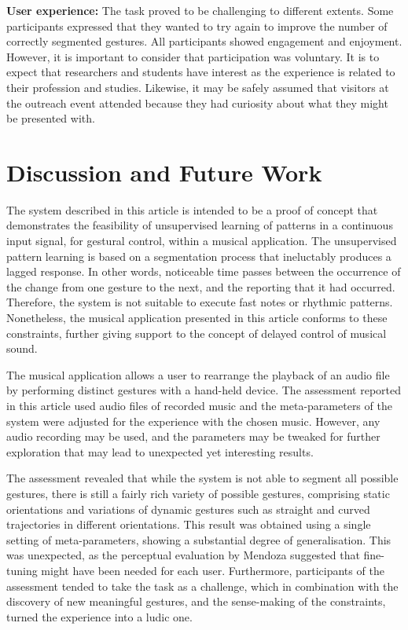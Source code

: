 \documentclass{nime-alternate_MANUSCRIPT} %
\begin{document}
\textbf{User experience:} The task proved to be challenging to different extents. Some participants expressed that they wanted to try again to improve the number of correctly segmented gestures. All participants showed engagement and enjoyment. However, it is important to consider that participation was voluntary. It is to expect that researchers and students have interest as the experience is related to their profession and studies. Likewise, it may be safely assumed that visitors at the outreach event attended because they had curiosity about what they might be presented with.

\section{Discussion and Future Work}

The system described in this article is intended to be a proof of concept that demonstrates the feasibility of unsupervised learning of patterns in a continuous input signal, for gestural control, within a musical application. The unsupervised pattern learning is based on a segmentation process that ineluctably produces a lagged response. In other words, noticeable time passes between the occurrence of the change from one gesture to the next, and the reporting that it had occurred. Therefore, the system is not suitable to execute fast notes or rhythmic patterns. Nonetheless, the musical application presented in this article conforms to these constraints, further giving support to the concept of delayed control of musical sound.

The musical application allows a user to rearrange the playback of an audio file by performing distinct gestures with a hand-held device. The assessment reported in this article used audio files of recorded music and the meta-parameters of the system were adjusted for the experience with the chosen music. However, any audio recording may be used, and the parameters may be tweaked for further exploration that may lead to unexpected yet interesting results.

The assessment revealed that while the system is not able to segment all possible gestures, there is still a fairly rich variety of possible gestures, comprising static orientations and variations of dynamic gestures such as straight and curved trajectories in different orientations. This  result was obtained using a single setting of meta-parameters, showing a substantial degree of generalisation. This was unexpected, as the perceptual evaluation by 
Mendoza \cite{Mendoza_2022}
suggested that fine-tuning might have been needed for each user. Furthermore, participants of the assessment tended to take the task as a challenge, which in combination with the discovery of new meaningful gestures, and the sense-making of the constraints, turned the experience into a ludic one.
\end{document}
